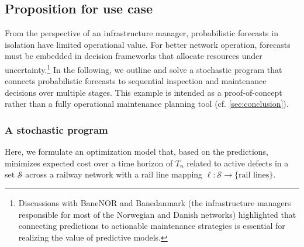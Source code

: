 \subsection{Proposition for use case} \label{sec:proposition_for_use}
From the perspective of an infrastructure manager, probabilistic forecasts in isolation have limited operational value. 
For better network operation, forecasts must be embedded in decision frameworks that allocate resources under uncertainty.\footnote{Discussions with BaneNOR and Banedanmark (the infrastructure managers responsible for most of the Norwegian and Danish networks) highlighted that connecting predictions to actionable maintenance strategies is essential for realizing the value of predictive models.}
In the following, we outline and solve a stochastic program that connects probabilistic forecasts to sequential inspection and maintenance decisions over multiple stages. This example is intended as a proof-of-concept rather than a fully operational maintenance planning tool (cf. \cref{sec:conclusion}).


\subsubsection{A stochastic program}
Here, we formulate an optimization model that, based on the predictions, minimizes expected cost over a time horizon of $T_n$ related to active defects in a set $\mathcal{S}$ across a railway network with a rail line mapping $\ell:\mathcal{S}\to\{\text{rail lines}\}$.


